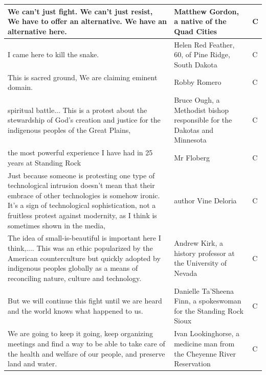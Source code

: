 \begin{footnotesize}
\begin{spacing}{1}
\begin{longtable}{| p{} | P{.25\textwidth} | p{.07\textwidth}|}
We can't just fight. We can't just resist, We have to offer an alternative. We have an alternative here.                                                              & Matthew Gordon, a native of the Quad Cities  & C              \\ \hline
I came here to kill the snake.                                                                      & Helen Red Feather, 60, of Pine Ridge, South Dakota                                                             & C              \\ \hline
This is sacred ground, We are claiming eminent domain.                                              & Robby Romero                                 & C              \\ \hline
spiritual battle... This is a protest about the stewardship of God's creation and justice for the indigenous peoples of the Great Plains,                               & Bruce Ough, a Methodist bishop responsible for the Dakotas and Minnesota                                       & C              \\ \hline
the most powerful experience I have had in 25 years at Standing Rock                                & Mr Floberg                                   & C              \\ \hline
Just because someone is protesting one type of technological intrusion doesn't mean that their embrace of other technologies is somehow ironic. It's a sign of technological sophistication, not a fruitless protest against modernity, as I think is sometimes shown in the media,                                         & author Vine Deloria                          & C              \\ \hline
The idea of small-is-beautiful is important here I think,.... This was an ethic popularized by the American counterculture but quickly adopted by indigenous peoples globally as a means of reconciling nature, culture and technology.                     & Andrew Kirk, a history professor at the University of Nevada                                                   & C              \\ \hline
But we will continue this fight until we are heard and the world knows what happened to us.         & Danielle Ta'Sheena Finn, a spokeswoman for the Standing Rock Sioux                                             & C              \\ \hline
We are going to keep it going, keep organizing meetings and find a way to be able to take care of the health and welfare of our people, and preserve land and water.  & Ivan Lookinghorse, a medicine man from the Cheyenne River Reservation                                          & C              \\ \hline

\end{longtable}
\end{spacing}
\end{footnotesize}
